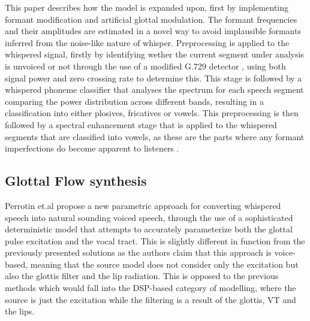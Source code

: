 This paper describes how the model is expanded upon, first by implementing formant modification and artificial glottal modulation. The formant frequencies and their amplitudes are estimated in a novel way to avoid implausible formants inferred from the noise-like nature of whisper. Preprocessing is applied to the whispered signal, firstly by identifying wether the current segment under analysis is unvoiced or not through the use of a modified G.729 detector \cite{beritelliPerformanceEvaluationComparison2002}, using both signal power and zero crossing rate to determine this. This stage is followed by a whispered phoneme classifier that analyses the spectrum for each speech segment comparing the power distribution across different bands, resulting in a classification into either plosives, fricatives or vowels. This preprocessing is then followed by a spectral enhancement stage that is applied to the whispered segments that are classified into vowels, as these are the parts where any formant imperfections do become apparent to listeners \cite{klattAnalysisSynthesisPerception1990}.



\subsection{Glottal Flow synthesis}

Perrotin et.al \cite{perrotinGlottalFlowSynthesis2020} propose a new parametric approach for converting whispered speech into natural sounding voiced speech, through the use of a sophisticated deterministic model that attempts to accurately parameterize both the glottal pulse excitation and the vocal tract. This is slightly different in function from the previously presented solutions as the authors claim that this approach is voice-based, meaning that the source model does not consider only the excitation but also the glottis filter and the lip radiation. This is opposed to the previous methods which would fall into the DSP-based category of modelling, where the source is just the excitation while the filtering is a result of the glottis, VT and the lips.

